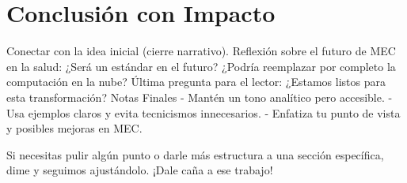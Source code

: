 \documentclass[11pt]{opticajnl}
\begin{document}
\section{Conclusión con Impacto}
Conectar con la idea inicial (cierre narrativo).
Reflexión sobre el futuro de MEC en la salud:
¿Será un estándar en el futuro?
¿Podría reemplazar por completo la computación en la nube?
Última pregunta para el lector: ¿Estamos listos para esta transformación?
Notas Finales
- Mantén un tono analítico pero accesible.
- Usa ejemplos claros y evita tecnicismos innecesarios.
- Enfatiza tu punto de vista y posibles mejoras en MEC.

Si necesitas pulir algún punto o darle más estructura a una sección específica, dime y seguimos ajustándolo. ¡Dale caña a ese trabajo! 
\end{document}
